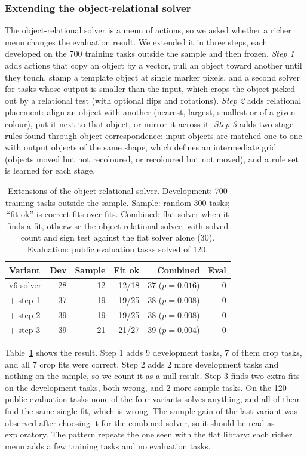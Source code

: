 \documentclass[sigconf,nonacm]{acmart}
\begin{document}
\subsubsection{Extending the object-relational solver}
\label{sec:orelx}

The object-relational solver is a menu of actions, so we asked whether a richer menu changes the evaluation result. We extended it in three steps, each developed on the 700 training tasks outside the sample and then frozen. \emph{Step 1} adds actions that copy an object by a vector, pull an object toward another until they touch, stamp a template object at single marker pixels, and a second solver for tasks whose output is smaller than the input, which crops the object picked out by a relational test (with optional flips and rotations). \emph{Step 2} adds relational placement: align an object with another (nearest, largest, smallest or of a given colour), put it next to that object, or mirror it across it. \emph{Step 3} adds two-stage rules found through object correspondence: input objects are matched one to one with output objects of the same shape, which defines an intermediate grid (objects moved but not recoloured, or recoloured but not moved), and a rule set is learned for each stage.

\begin{table}[t]
\caption{Extensions of the object-relational solver. Development: 700 training tasks outside the sample. Sample: random 300 tasks; ``fit ok'' is correct fits over fits. Combined: flat solver when it finds a fit, otherwise the object-relational solver, with solved count and sign test against the flat solver alone (30). Evaluation: public evaluation tasks solved of 120.}
\label{tab:orelx}
\footnotesize\setlength{\tabcolsep}{4pt}
\begin{tabular}{@{}lrrrrr@{}}
\toprule
Variant & Dev & Sample & Fit ok & Combined & Eval \\
\midrule
v6 solver & 28 & 12 & 12/18 & 37 ($p=0.016$) & 0 \\
+ step 1 & 37 & 19 & 19/25 & 38 ($p=0.008$) & 0 \\
+ step 2 & 39 & 19 & 19/25 & 38 ($p=0.008$) & 0 \\
+ step 3 & 39 & 21 & 21/27 & 39 ($p=0.004$) & 0 \\
\bottomrule
\end{tabular}
\end{table}

Table~\ref{tab:orelx} shows the result. Step 1 adds 9 development tasks, 7 of them crop tasks, and all 7 crop fits were correct. Step 2 adds 2 more development tasks and nothing on the sample, so we count it as a null result. Step 3 finds two extra fits on the development tasks, both wrong, and 2 more sample tasks. On the 120 public evaluation tasks none of the four variants solves anything, and all of them find the same single fit, which is wrong. The sample gain of the last variant was observed after choosing it for the combined solver, so it should be read as exploratory. The pattern repeats the one seen with the flat library: each richer menu adds a few training tasks and no evaluation tasks.
\end{document}

